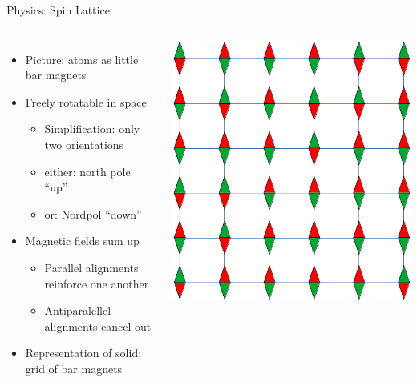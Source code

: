 \begin{frame}{Physics: Spin Lattice}
%
\begin{columns}[T]
\begin{itemize}
\item Picture: atoms as little bar magnets
\item Freely rotatable in space
	\begin{itemize}
	\item Simplification: only two orientations
	\item either: north pole \enquote{up}
	\item or: Nordpol \enquote{down}
	\end{itemize}
\item Magnetic fields sum up
	\begin{itemize}
	\item Parallel alignments reinforce one another
	\item Antiparalellel alignments cancel out
	\end{itemize}
\item Representation of solid: grid of bar magnets
\end{itemize}
%
\includegraphics[width=.7\linewidth]{./gfx/spinLattice}
\end{columns}
%
\end{frame}



